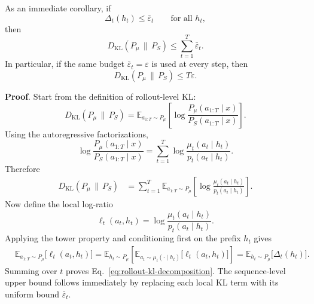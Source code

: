 \documentclass[11pt]{article}
\renewcommand{\paragraph}[1]{\vspace{1mm}\noindent\textbf{#1}.}
\begin{document}
As an immediate corollary, if
\[
\Delta_t(h_t)\le \bar\varepsilon_t
\qquad\text{for all } h_t,
\]
then
\begin{equation}
D_{\mathrm{KL}}(P_{\mu}\,\|\,P_S)
\le
\sum_{t=1}^T \bar\varepsilon_t.
\end{equation}
In particular, if the same budget $\bar\varepsilon_t=\varepsilon$ is used at every step, then
\begin{equation}
D_{\mathrm{KL}}(P_{\mu}\,\|\,P_S)
\le
T\varepsilon.
\end{equation}

\paragraph{Proof}
Start from the definition of rollout-level KL:
\begin{equation*}
D_{\mathrm{KL}}(P_{\mu}\,\|\,P_S)
=
\mathbb{E}_{a_{1:T}\sim P_{\mu}}
\left[
\log \frac{P_{\mu}(a_{1:T}\mid x)}{P_S(a_{1:T}\mid x)}
\right].
\end{equation*}
Using the autoregressive factorizations,
\begin{equation*}
\log \frac{P_{\mu}(a_{1:T}\mid x)}{P_S(a_{1:T}\mid x)}
=
\sum_{t=1}^T
\log \frac{\mu_t(a_t\mid h_t)}{p_t(a_t\mid h_t)}.
\end{equation*}
Therefore
\begin{align*}
D_{\mathrm{KL}}(P_{\mu}\,\|\,P_S)
&=
\sum_{t=1}^T
\mathbb{E}_{a_{1:T}\sim P_{\mu}}
\left[
\log \frac{\mu_t(a_t\mid h_t)}{p_t(a_t\mid h_t)}
\right].
\end{align*}
Now define the local log-ratio
\[
\ell_t(a_t,h_t)
=
\log \frac{\mu_t(a_t\mid h_t)}{p_t(a_t\mid h_t)}.
\]
Applying the tower property and conditioning first on the prefix $h_t$ gives
\begin{align*}
&\mathbb{E}_{a_{1:T}\sim P_{\mu}}
\bigl[\ell_t(a_t,h_t)\bigr]
=\mathbb{E}_{h_t\sim P_{\mu}}
\left[
\mathbb{E}_{a_t\sim \mu_t(\cdot\mid h_t)}
\bigl[\ell_t(a_t,h_t)\bigr]
\right] =
\mathbb{E}_{h_t\sim P_{\mu}}
\bigl[\Delta_t(h_t)\bigr].
\end{align*}
Summing over $t$ proves Eq.~\ref{eq:rollout-kl-decomposition}.
The sequence-level upper bound follows immediately by replacing each local KL term with its uniform bound $\bar\varepsilon_t$.
\end{document}
